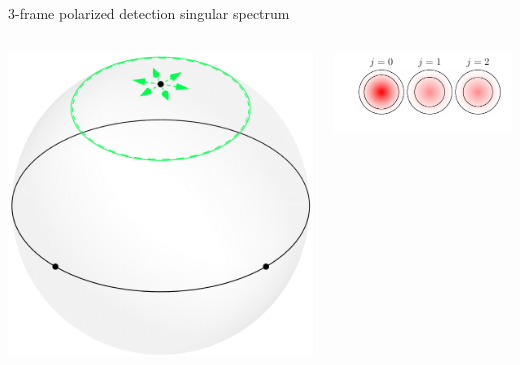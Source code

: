 \documentclass[presentation]{beamer}
\begin{document}
\begin{frame}[label=sec-1]{3-frame polarized detection singular spectrum}
  \begin{columns}
    \begin{column}{0.25\textwidth}
      \centering
      \includegraphics[width=1.0\columnwidth]{pol_detect3/scene.pdf}
    \end{column}
    \begin{column}{0.75\textwidth}
      \centering
      \includegraphics[width=1.0\columnwidth]{pol_detect3/svs.pdf}
    \end{column}
  \end{columns}
\end{frame}
\end{document}
